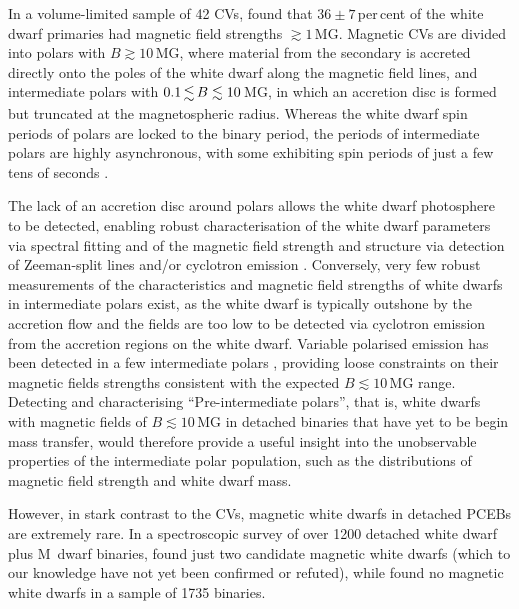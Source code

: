 \documentclass[fleqn,usenatbib]{mnras}
\newcommand{\bgc}[1]{\textcolor{orange}{[#1]}}
\begin{document}
In a volume-limited sample of 42 CVs, \citet{palaetal20-1} found that $36\pm7$\,per\,cent of the white dwarf primaries had magnetic field strengths $\gtrsim 1$\,MG. Magnetic CVs are divided into polars with $B \gtrsim 10$\,MG, where material from the secondary is accreted directly onto the poles of the white dwarf along the magnetic field lines, and intermediate polars with  $0.1 \la B \lesssim 10$\,MG, in which an accretion disc is formed but truncated at the magnetospheric radius. Whereas the white dwarf spin periods of polars are locked to the binary period, the periods of intermediate polars are highly asynchronous, with some exhibiting spin periods of just a few tens of seconds \citep{patterson79-1,lopesdeoliveiraetal20-1}.     


The lack of an accretion disc around polars allows the white dwarf photosphere to be detected, enabling robust characterisation of the white dwarf parameters via spectral fitting and of the magnetic field strength and structure via detection of Zeeman-split lines and/or cyclotron emission \citep[e.g.][]{schwope90-1, gaensickeetal04-1, ferrarioetal95-1}. Conversely, very few robust measurements of the characteristics and magnetic field strengths of white dwarfs in intermediate polars exist, as the white dwarf is typically outshone by the accretion flow and the fields are too low to be detected via cyclotron emission from the accretion regions on the white dwarf. Variable polarised emission has been detected in a few intermediate polars \citep[e.g. ][]{potter+buckley18-1}, providing loose constraints on their magnetic fields strengths consistent with the expected $B \lesssim 10$\,MG range. Detecting and characterising ``Pre-intermediate polars'', that is, white dwarfs with magnetic fields of  $B \lesssim 10$\,MG in detached binaries that have yet to be begin mass transfer, would therefore provide a useful insight into the unobservable properties of the intermediate polar population, such as the distributions of magnetic field strength and white dwarf mass. 

However, in stark contrast to the CVs, magnetic white dwarfs in detached PCEBs are extremely rare. In a spectroscopic survey of over 1200 detached white dwarf plus M~dwarf binaries, \citet{silvestrietal07-1} found just two candidate magnetic white dwarfs (which to our knowledge have not yet been confirmed or refuted), while \citet{liebertetal15-1} found no magnetic white dwarfs in a sample of 1735 binaries. 
\end{document}

